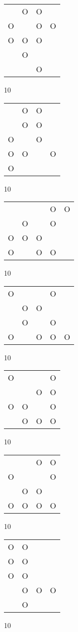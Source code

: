 \begin{tabular}{|m{0.2cm}m{0.2cm}m{0.2cm}m{0.2cm}|}\hline
 &O&O& \\
O& &O&O\\
O&O&O& \\
 &O& & \\
 & &O& \\
\hline\end{tabular}10
\begin{tabular}{|m{0.2cm}m{0.2cm}m{0.2cm}m{0.2cm}|}\hline
 &O&O& \\
 &O&O& \\
O& &O& \\
O&O& &O\\
O& & & \\
\hline\end{tabular}10
\begin{tabular}{|m{0.2cm}m{0.2cm}m{0.2cm}m{0.2cm}m{0.2cm}|}\hline
 & & &O&O\\
 &O& &O& \\
O&O&O& & \\
O& &O&O& \\
\hline\end{tabular}10
\begin{tabular}{|m{0.2cm}m{0.2cm}m{0.2cm}m{0.2cm}m{0.2cm}|}\hline
O& & &O& \\
 &O&O& & \\
 &O& &O& \\
O& &O&O&O\\
\hline\end{tabular}10
\begin{tabular}{|m{0.2cm}m{0.2cm}m{0.2cm}m{0.2cm}|}\hline
O& & &O\\
 & &O&O\\
O&O& &O\\
 &O&O&O\\
\hline\end{tabular}10
\begin{tabular}{|m{0.2cm}m{0.2cm}m{0.2cm}m{0.2cm}|}\hline
 & &O&O\\
O& & &O\\
 &O&O& \\
O&O&O&O\\
\hline\end{tabular}10
\begin{tabular}{|m{0.2cm}m{0.2cm}m{0.2cm}m{0.2cm}|}\hline
O&O& & \\
O&O& & \\
O&O& & \\
 &O&O&O\\
 &O& & \\
\hline\end{tabular}10
